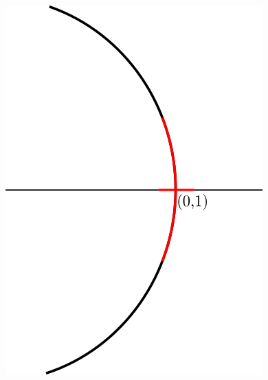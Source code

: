 \documentclass{beamer}
\begin{document}
\begin{frame}
\begin{columns}
\begin{center}
        \end{center}
    \end{columns}
\end{frame}

\begin{frame}
    \begin{figure}[ht]
      \begin{center}
      \includegraphics[width=0.5\linewidth]{../gfx/unit-circle3}
      \end{center}
    \end{figure}
\end{frame}
\end{document}
